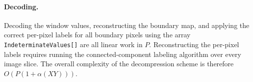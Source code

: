 \paragraph{Decoding.}

Decoding the window values, reconstructing the boundary map, and applying the correct per-pixel labels for all boundary pixels using the array \texttt{IndeterminateValues[]} are all linear work in $P$.  Reconstructing the per-pixel labels requires running the connected-component labeling algorithm over every image slice. The overall complexity of the decompression scheme is therefore $O\left({P(1 + \alpha(XY))}\right)$.

%
%
%
%
